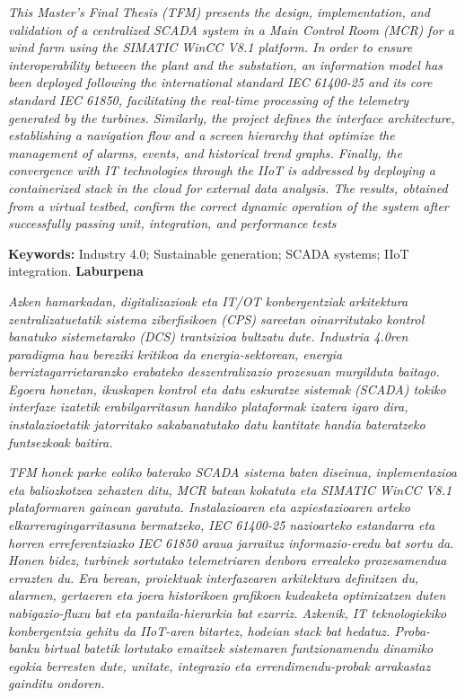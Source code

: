 \textit{ This Master's Final Thesis (\ac{TFM}) presents the design, implementation, and validation of a centralized SCADA system in a Main Control Room (\ac{MCR}) for a wind farm using the SIMATIC WinCC V8.1 platform. In order to ensure interoperability between the plant and the substation, an information model has been deployed following the international standard IEC 61400-25 and its core standard IEC 61850, facilitating the real-time processing of the telemetry generated by the turbines. Similarly, the project defines the interface architecture, establishing a navigation flow and a screen hierarchy that optimize the management of alarms, events, and historical trend graphs. Finally, the convergence with \ac{IT} technologies through the \ac{IIoT} is addressed by deploying a containerized \textit{stack} in the cloud for external data analysis. The results, obtained from a virtual testbed, confirm the correct dynamic operation of the system after successfully passing unit, integration, and performance tests}\par

\textbf{Keywords:} Industry 4.0; Sustainable generation; SCADA systems; \ac{IIoT} integration.
\vspace*{5mm}
\newpage
\textbf{Laburpena}

\textit{Azken hamarkadan, digitalizazioak eta IT/OT konbergentziak arkitektura zentralizatuetatik sistema ziberfisikoen (CPS) sareetan oinarritutako kontrol banatuko sistemetarako (DCS) trantsizioa bultzatu dute. Industria 4.0ren paradigma hau bereziki kritikoa da energia-sektorean, energia berriztagarrietaranzko erabateko deszentralizazio prozesuan murgilduta baitago. Egoera honetan, ikuskapen kontrol eta datu eskuratze sistemak (SCADA) tokiko interfaze izatetik erabilgarritasun handiko plataformak izatera igaro dira, instalazioetatik jatorritako sakabanatutako datu kantitate handia bateratzeko funtsezkoak baitira.}\par

\textit{\ac{TFM} honek parke eoliko baterako \ac{SCADA} sistema baten diseinua, inplementazioa eta baliozkotzea zehazten ditu, \ac{MCR} batean kokatuta eta SIMATIC WinCC V8.1 plataformaren gainean garatuta. Instalazioaren eta azpiestazioaren arteko elkarreragingarritasuna bermatzeko, IEC 61400-25 nazioarteko estandarra eta horren erreferentziazko IEC 61850 araua jarraituz informazio-eredu bat sortu da. Honen bidez, turbinek sortutako telemetriaren denbora errealeko prozesamendua errazten du. Era berean, proiektuak interfazearen arkitektura definitzen du, alarmen, gertaeren eta joera historikoen grafikoen kudeaketa optimizatzen duten nabigazio-fluxu bat eta pantaila-hierarkia bat ezarriz. Azkenik, \ac{IT} teknologiekiko konbergentzia gehitu da \ac{IIoT}-aren bitartez, hodeian \textit{stack} bat hedatuz. Proba-banku birtual batetik lortutako emaitzek sistemaren funtzionamendu dinamiko egokia berresten dute, unitate, integrazio eta errendimendu-probak arrakastaz gainditu ondoren.}\par

